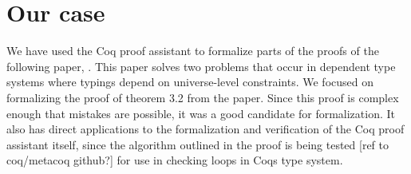 \chapter{Our case}

We have used the Coq proof assistant to formalize parts of the proofs of the following paper, \citeauthor{mbezem} \cite{mbezem}.
This paper solves two problems that occur in dependent type systems where typings depend
on universe-level constraints. We focused on formalizing the proof of theorem 3.2 from the paper.
Since this proof is complex enough that mistakes are possible, it was a good candidate for formalization.
It also has direct applications to the formalization and verification of the Coq proof assistant itself,
since the algorithm outlined in the proof is being tested [ref to coq/metacoq github?] for use in checking loops in Coqs type system.
